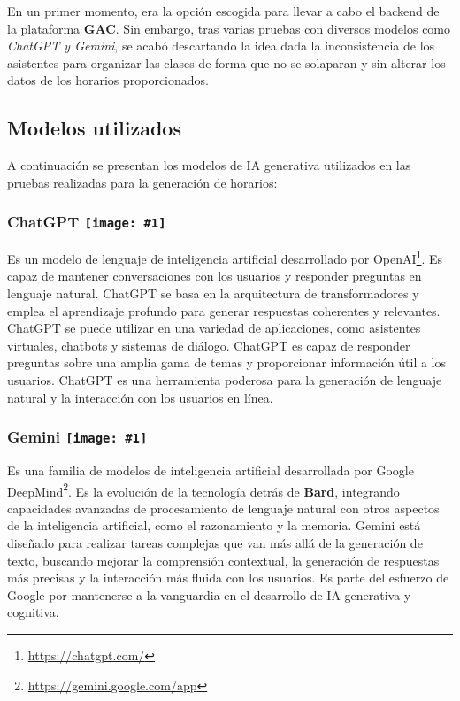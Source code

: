 En un primer momento, era la opción escogida para llevar a cabo el backend de la plataforma \textbf{GAC}. Sin embargo, tras varias pruebas con diversos modelos como \emph{ChatGPT y Gemini}, se acabó descartando la idea dada la inconsistencia de los asistentes para organizar las clases de forma que no se solaparan y sin alterar los datos de los horarios proporcionados.

\subsection{Modelos utilizados}

A continuación se presentan los modelos de IA generativa utilizados en las pruebas realizadas para la generación de horarios:

\newcommand{\icon}[1]{\texttt{[image: \#1]}}
\subsubsection*{ChatGPT \protect\icon{./imagenes/ChatGPT_logo.png}}

Es un modelo de lenguaje de inteligencia artificial desarrollado por OpenAI\footnote{\url{https://chatgpt.com/}}. Es capaz de mantener conversaciones con los usuarios y responder preguntas en lenguaje natural. ChatGPT se basa en la arquitectura de transformadores y emplea el aprendizaje profundo para generar respuestas coherentes y relevantes. ChatGPT se puede utilizar en una variedad de aplicaciones, como asistentes virtuales, chatbots y sistemas de diálogo. ChatGPT es capaz de responder preguntas sobre una amplia gama de temas y proporcionar información útil a los usuarios. ChatGPT es una herramienta poderosa para la generación de lenguaje natural y la interacción con los usuarios en línea.

\renewcommand{\icon}[1]{\texttt{[image: \#1]}}
\subsubsection*{Gemini \protect\icon{./imagenes/gemini-icon.png}}

Es una familia de modelos de inteligencia artificial desarrollada por Google DeepMind\footnote{\url{https://gemini.google.com/app}}. Es la evolución de la tecnología detrás de \textbf{Bard}, integrando capacidades avanzadas de procesamiento de lenguaje natural con otros aspectos de la inteligencia artificial, como el razonamiento y la memoria. Gemini está diseñado para realizar tareas complejas que van más allá de la generación de texto, buscando mejorar la comprensión contextual, la generación de respuestas más precisas y la interacción más fluida con los usuarios. Es parte del esfuerzo de Google por mantenerse a la vanguardia en el desarrollo de IA generativa y cognitiva.

